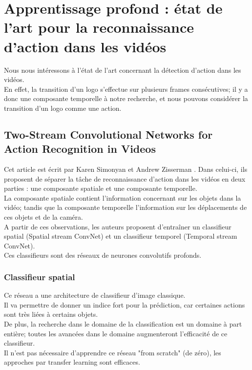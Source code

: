 \documentclass[11pt]{article}
\begin{document}
\newpage
\section{Apprentissage profond : état de l'art pour la reconnaissance d'action dans les vidéos}
\label{sec:orgb425215}
Nous nous intéressons à l'état de l'art concernant la détection d'action dans les vidéos.\\
En effet, la transition d'un logo s'effectue sur plusieurs frames consécutives; il y a donc une composante temporelle à notre recherche, et nous pouvons considérer la transition d'un logo comme une action.\\

\subsection{Two-Stream Convolutional Networks for Action Recognition in Videos}
\label{sec:org0d23f62}
Cet article est écrit par Karen Simonyan et Andrew Zisserman \cite{DBLP:journals/corr/SimonyanZ14}. Dans celui-ci, ils proposent de séparer la tâche de reconnaissance d'action dans les vidéos en deux parties : une composante spatiale et une composante temporelle.\\

La composante spatiale contient l'information concernant sur les objets dans la vidéo; tandis que la composante temporelle l'information sur les déplacements de ces objets et de la caméra.\\
A partir de ces observations, les auteurs proposent d'entraîner un classifieur spatial (Spatial stream ConvNet) et un classifieur temporel (Temporal stream ConvNet).\\

Ces classifieurs sont des réseaux de neurones convolutifs profonds.\\

\subsubsection{Classifieur spatial}
\label{sec:org5bdb7c9}
Ce réseau a une architecture de classifieur d'image classique.\\
Il va permettre de donner un indice fort pour la prédiction, car certaines actions sont très liées à certains objets.\\
De plus, la recherche dans le domaine de la classification est un domaine à part entière; toutes les avancées dans le domaine augmenteront l'efficacité de ce classifieur.\\
Il n'est pas nécessaire d'apprendre ce réseau "from scratch" (de zéro), les approches par transfer learning sont efficaces.\\
\end{document}
